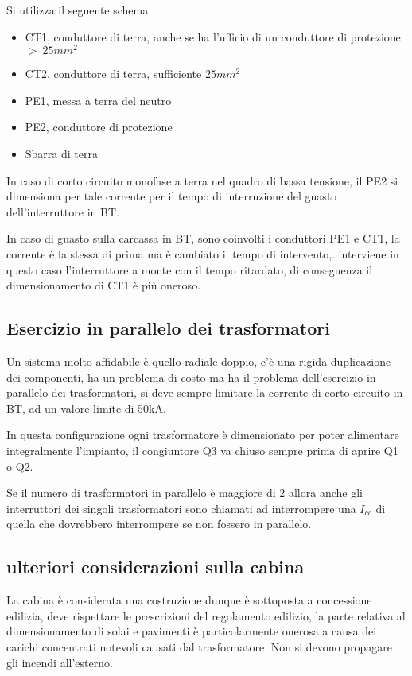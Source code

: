 Si utilizza il seguente schema
\begin{itemize}
    \item CT1, conduttore di terra, anche se ha l'ufficio di un conduttore di protezione $>\ 25mm^2$
    \item CT2, conduttore di terra, sufficiente $25mm^2$
    \item PE1, messa a terra del neutro 
    \item PE2, conduttore di protezione 
    \item Sbarra di terra
\end{itemize}
In caso di corto circuito monofase a terra nel quadro di bassa tensione, il PE2 si dimensiona per tale corrente per il tempo di interruzione del guasto dell'interruttore in BT.

In caso di guasto sulla carcassa in BT, sono coinvolti i conduttori PE1 e CT1, la corrente è la stessa di prima ma è cambiato il tempo di intervento,. interviene in questo caso l'interruttore a monte con il tempo ritardato, di conseguenza il dimensionamento di CT1 è più oneroso.

\subsection{Esercizio in parallelo dei trasformatori}
Un sistema molto affidabile è quello radiale doppio, c'è una rigida 
duplicazione dei componenti, ha un problema di costo ma ha il problema 
dell'esercizio in parallelo dei trasformatori, si deve sempre limitare la 
corrente di corto circuito in BT, ad un valore limite di 50kA.

In questa configurazione ogni trasformatore è dimensionato per poter alimentare 
integralmente l'impianto, il congiuntore Q3 va chiuso sempre prima di aprire Q1 
o Q2.

Se il numero di trasformatori in parallelo è maggiore di 2 allora anche gli interruttori dei singoli trasformatori sono chiamati ad interrompere una $I_{cc}$ di quella che dovrebbero interrompere se non fossero in parallelo.

\subsection{ulteriori considerazioni sulla cabina}
La cabina è considerata una costruzione dunque è sottoposta a concessione edilizia, deve rispettare le prescrizioni del regolamento edilizio, la parte relativa al dimensionamento di solai e pavimenti è particolarmente onerosa a causa dei carichi concentrati notevoli causati dal trasformatore. Non si devono propagare gli incendi all'esterno.


